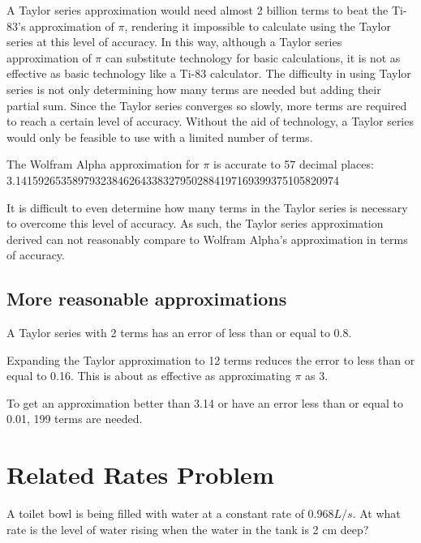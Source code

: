 \documentclass[12pt, titlepage]{article}
\begin{document}
A Taylor series approximation would need almost 2 billion terms to beat the Ti-83's approximation of \(\pi\), rendering it impossible to calculate using the Taylor series at this level of accuracy. In this way, although a Taylor series approximation of \(\pi\) can substitute technology for basic calculations, it is not as effective as basic technology like a Ti-83 calculator. The difficulty in using Taylor series is not only determining how many terms are needed but adding their partial sum. Since the Taylor series converges so slowly, more terms are required to reach a certain level of accuracy. Without the aid of technology, a Taylor series would only be feasible to use with a limited number of terms.

The Wolfram Alpha approximation for \(\pi\) is accurate to 57 decimal places:
3.141592653589793238462643383279502884197169399375105820974

It is difficult to even determine how many terms in the Taylor series is necessary to overcome this level of accuracy. As such, the Taylor series approximation derived can not reasonably compare to Wolfram Alpha's approximation in terms of accuracy.

\subsection{More reasonable approximations}
A Taylor series with 2 terms has an error of less than or equal to 0.8.

Expanding the Taylor approximation to 12 terms reduces the error to less than or equal to 0.16. This is about as effective as approximating \(\pi\) as 3.

To get an approximation better than 3.14 or have an error less than or equal to 0.01, 199 terms are needed. 

\section{Related Rates Problem}
A toilet bowl is being filled with water at a constant rate of \(0.968 L/s\). At what rate is the level of water rising when the water in the tank is 2 cm deep?
\end{document}
